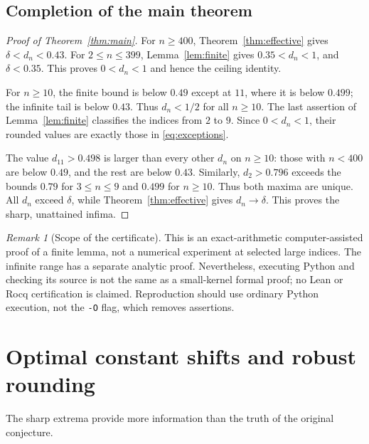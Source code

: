 \documentclass[11pt]{article}
\numberwithin{equation}{section}
\theoremstyle{definition}
\theoremstyle{remark}
\newtheorem{remark}[theorem]{Remark}
\begin{document}
\subsection{Completion of the main theorem}
\begin{proof}[Proof of Theorem~\ref{thm:main}]
For $n\ge400$, Theorem~\ref{thm:effective} gives
$\delta<d_n<0.43$. For $2\le n\le399$, Lemma~\ref{lem:finite} gives
$0.35<d_n<1$, and $\delta<0.35$. This proves $0<d_n<1$ and hence the
ceiling identity.

For $n\ge10$, the finite bound is below $0.49$ except at $11$, where
it is below $0.499$; the infinite tail is below $0.43$. Thus $d_n<1/2$
for all $n\ge10$. The last assertion of Lemma~\ref{lem:finite}
classifies the indices from $2$ to $9$. Since $0<d_n<1$, their rounded
values are exactly those in \eqref{eq:exceptions}.

The value $d_{11}>0.498$ is larger than every other $d_n$ on $n\ge10$:
those with $n<400$ are below $0.49$, and the rest are below $0.43$.
Similarly, $d_2>0.796$ exceeds the bounds $0.79$ for $3\le n\le9$
and $0.499$ for $n\ge10$. Thus both maxima are unique.
All $d_n$ exceed $\delta$, while Theorem~\ref{thm:effective} gives
$d_n\to\delta$. This proves the sharp, unattained infima.
\end{proof}

\begin{remark}[Scope of the certificate]
This is an exact-arithmetic computer-assisted proof of a finite lemma,
not a numerical experiment at selected large indices. The infinite
range has a separate analytic proof. Nevertheless, executing Python
and checking its source is not the same as a small-kernel formal proof;
no Lean or Rocq certification is claimed. Reproduction should use
ordinary Python execution, not the \texttt{-O} flag, which removes
assertions.
\end{remark}

\section{Optimal constant shifts and robust rounding}\label{sec:calibration}
The sharp extrema provide more information than the truth of the
original conjecture.
\end{document}

